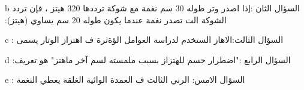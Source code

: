 \documentclass[a4paper]{article}
\begin{document}
\begin{examcopy}
\begin{multicols}{3}
  \begin{Arabic}\begin{question}{b}
  ‫السؤال الثان :إذا اصدر وتر طوله 30 سم نغمة مع شوكة ترددها 320 هيتز ، فإن تردد الشوكة الت تصدر نغمة عندما يكون طوله 20 سم يساوي (هيتز):
    \columnseprule=0pt\begin{multicols}{2}
    \begin{choices}[o]
    \end{choices}
    \end{multicols}
  \end{question}\end{Arabic}

 \begin{Arabic}\begin{question}{c}
       ‫السؤال الثالث:الاهاز الستخدم لدراسة العوامل الؤةثرة ف اهتزاز الوتار يسمى :‬
    \columnseprule=0pt\begin{multicols}{2}
    \begin{choices}
    \end{choices}
    \end{multicols}
  \end{question}\end{Arabic}

  \begin{Arabic}\begin{question}{d}
  ‫السؤال الرابع :"اضطرار جسم للهتزاز بسبب ملمسته لسم آخر ماهتز" هو تعريف:‬
    \begin{choices}
    \end{choices}
  \end{question}\end{Arabic}
  
  
  
 \begin{Arabic}\begin{question}{e}
 ‫السؤال الامس: الرني الثالث ف العمدة الوائية الغلقة يعطي النغمة :
    \columnseprule=0pt\begin{multicols}{2}
    \begin{choices}
    \end{choices}
    \end{multicols}
  \end{question}\end{Arabic}



\end{multicols}
\end{examcopy}
\end{document}
